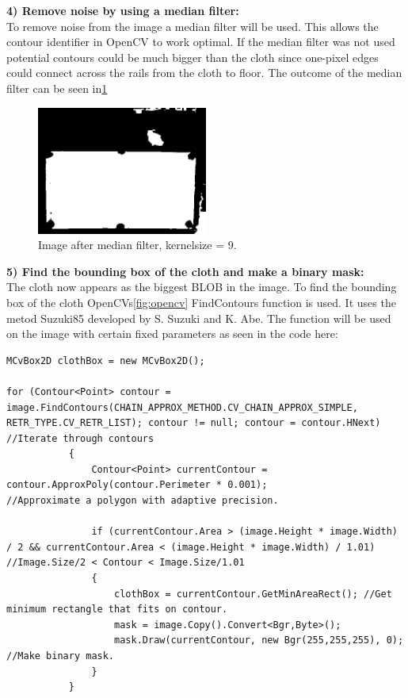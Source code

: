 \textbf{4) Remove noise by using a median filter:}\\
To remove noise from the image a median filter will be used. This allows the contour identifier in OpenCV\cite{opencv} to work optimal. If the median filter was not used potential contours could be much bigger than the cloth since one-pixel edges could connect across the rails from the cloth to floor. The outcome of the median filter can be seen in\ref{fig:afterclothmedian}

\begin{figure}[H]
\begin{center}
\leavevmode
\includegraphics[width=0.5\textwidth]{images/afterclothmedian}
\end{center}
\caption{Image after median filter, kernelsize = 9.}
\label{fig:afterclothmedian}
\end{figure}

\textbf{5) Find the bounding box of the cloth and make a binary mask:}\\
The cloth now appears as the biggest BLOB in the image. To find the bounding box of the cloth OpenCVs\ref{fig:opencv} FindContours function is used. It uses the metod Suzuki85 developed by S. Suzuki and K. Abe\cite{contour}. The function will be used on the image with certain fixed parameters as seen in the code here:

\begin{lstlisting}
MCvBox2D clothBox = new MCvBox2D();

for (Contour<Point> contour = image.FindContours(CHAIN_APPROX_METHOD.CV_CHAIN_APPROX_SIMPLE, RETR_TYPE.CV_RETR_LIST); contour != null; contour = contour.HNext)  //Iterate through contours
           {
               Contour<Point> currentContour = contour.ApproxPoly(contour.Perimeter * 0.001);                                           //Approximate a polygon with adaptive precision.

               if (currentContour.Area > (image.Height * image.Width) / 2 && currentContour.Area < (image.Height * image.Width) / 1.01)  //Image.Size/2 < Contour < Image.Size/1.01
               {
                   clothBox = currentContour.GetMinAreaRect(); //Get minimum rectangle that fits on contour.
                   mask = image.Copy().Convert<Bgr,Byte>();	   
                   mask.Draw(currentContour, new Bgr(255,255,255), 0); //Make binary mask.                                                                         
               }
           }
\end{lstlisting}

